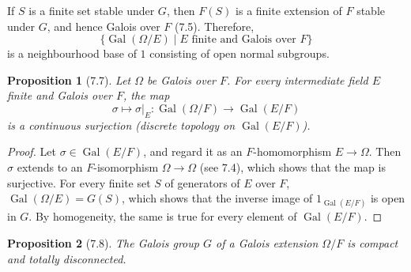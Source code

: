 \documentclass[UTF8,11pt]{ctexart}
\newtheorem*{proposition}{Proposition}
\theoremstyle{definition}
\begin{document}
If $S$ is a finite set stable under $G$, then $F(S)$ is a finite extension of $F$ stable under $G$, and hence Galois over $F$ (7.5). Therefore,
\[
\{\operatorname{Gal}(\Omega/E)\mid E\text{ finite and Galois over }F\}
\]
is a neighbourhood base of $1$ consisting of open normal subgroups.
\begin{proposition}[7.7]
Let $\Omega$ be Galois over $F$. For every intermediate field $E$ finite and Galois over $F$, the map
\[
\sigma\longmapsto\sigma|_E:\operatorname{Gal}(\Omega/F)\longrightarrow\operatorname{Gal}(E/F)
\]
is a continuous surjection (discrete topology on $\operatorname{Gal}(E/F)$).
\end{proposition}
\begin{proof}
Let $\sigma\in\operatorname{Gal}(E/F)$, and regard it as an $F$-homomorphism $E\to\Omega$. Then $\sigma$ extends to an $F$-isomorphism $\Omega\to\Omega$ (see 7.4), which shows that the map is surjective. For every finite set $S$ of generators of $E$ over $F$, $\operatorname{Gal}(\Omega/E)=G(S)$, which shows that the inverse image of $1_{\operatorname{Gal}(E/F)}$ is open in $G$. By homogeneity, the same is true for every element of $\operatorname{Gal}(E/F)$.
\end{proof}
\begin{proposition}[7.8]
The Galois group $G$ of a Galois extension $\Omega/F$ is compact and totally disconnected.
\end{proposition}
\end{document}
